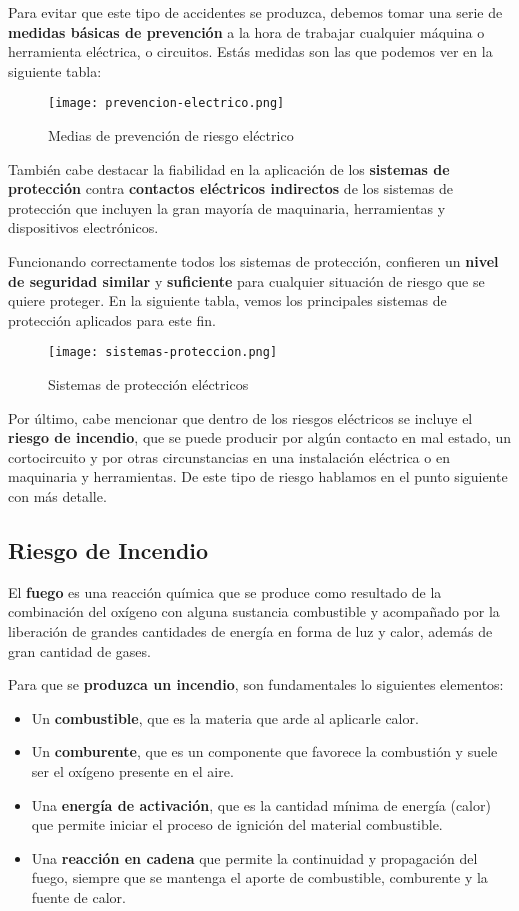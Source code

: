 Para evitar que este tipo de accidentes se produzca, debemos tomar una serie de \textbf{medidas básicas de prevención} a la hora de trabajar cualquier máquina o herramienta eléctrica, o circuitos. Estás medidas son las que podemos ver en la siguiente tabla:

\begin{figure}[H]
    \centering
    \texttt{[image: prevencion-electrico.png]}
    \caption{Medias de prevención de riesgo eléctrico}
\end{figure}

También cabe destacar la fiabilidad en la aplicación de los \textbf{sistemas de protección} contra \textbf{contactos eléctricos indirectos} de los sistemas de protección que incluyen la gran mayoría de maquinaria, herramientas y dispositivos electrónicos.

Funcionando correctamente todos los sistemas de protección, confieren un \textbf{nivel de seguridad similar} y \textbf{suficiente} para cualquier situación de riesgo que se quiere proteger. En la siguiente tabla, vemos los principales sistemas de protección aplicados para este fin.

\begin{figure}[H]
    \centering
    \texttt{[image: sistemas-proteccion.png]}
    \caption{Sistemas de protección eléctricos}
\end{figure}

Por último, cabe mencionar que dentro de los riesgos eléctricos se incluye el \textbf{riesgo de incendio}, que se puede producir por algún contacto en mal estado, un cortocircuito y por otras circunstancias en una instalación eléctrica o en maquinaria y herramientas. De este tipo de riesgo hablamos en el punto siguiente con más detalle.

\subsection{Riesgo de Incendio}
El \textbf{fuego} es una reacción química que se produce como resultado de la combinación del oxígeno con alguna sustancia combustible y acompañado por la liberación de grandes cantidades de energía en forma de luz y calor, además de gran cantidad de gases.

Para que se \textbf{produzca un incendio}, son fundamentales lo siguientes elementos:

\begin{itemize}
    \item Un \textbf{combustible}, que es la materia que arde al aplicarle calor.
    \item Un \textbf{comburente}, que es un componente que favorece la combustión y suele ser el oxígeno presente en el aire.
    \item Una \textbf{energía de activación}, que es la cantidad mínima de energía (calor) que permite iniciar el proceso de ignición del material combustible.
    \item Una \textbf{reacción en cadena} que permite la continuidad y propagación del fuego, siempre que se mantenga el aporte de combustible, comburente y la fuente de calor.
\end{itemize}

